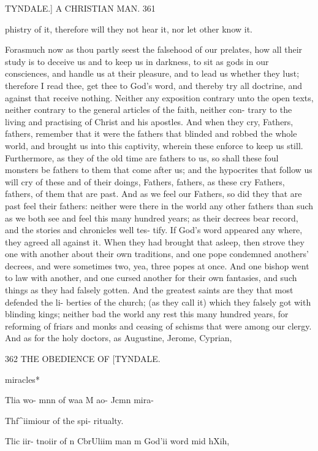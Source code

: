 \documentclass{custom}
\begin{document}
{TYNDALE.] A CHRISTIAN MAN. 361

phistry of it, therefore will they not hear it, nor let other 
know it. 

Forasmuch now as thou partly seest the falsehood of 
our prelates, how all their study is to deceive us and to 
keep us in darkness, to sit as gods in our consciences, and 
handle us at their pleasure, and to lead us whether they 
lust; therefore I read thee, get thee to God's word, and 
thereby try all doctrine, and against that receive nothing. 
Neither any exposition contrary unto the open texts, neither 
contrary to the general articles of the faith, neither con- 
trary to the living and practising of Christ and his apostles. 
And when they cry, Fathers, fathers, remember that it were
the fathers that blinded and robbed the whole world, and 
brought us into this captivity, wherein these enforce to 
keep us still. Furthermore, as they of the old time are 
fathers to us, so shall these foul monsters be fathers to 
them that come after us; and the hypocrites that follow us 
will cry of these and of their doings, Fathers, fathers, as 
these cry Fathers, fathers, of them that are past. And as we 
feel our Fathers, so did they that are past feel their fathers: 
neither were there in the world any other fathers than such 
as we both see and feel this many hundred years; as their 
decrees bear record, and the stories and chronicles well tes- 
tify. If God's word appeared any where, they agreed all 
against it. When they had brought that asleep, then 
strove they one with another about their own traditions, 
and one pope condemned anothers' decrees, and were 
sometimes two, yea, three popes at once. And one bishop 
went to law with another, and one cursed another for their 
own fantasies, and such things as they had falsely gotten. 
And the greatest saints are they that most defended the li- 
berties of the church; (as they call it) which they falsely got 
with blinding kings; neither bad the world any rest this 
many hundred years, for reforming of friars and monks 
and ceasing of schisms that were among our clergy. And 
as for the holy doctors, as Augustine, Jerome, Cyprian, 


362
THE OBEDIENCE OF
[TYNDALE.

miracles* 

Tlia wo- 
mnn of 
waa M ao- 
Jcmn mira- 

Thf^iimiour 
of the spi- 
ritualty. 

Tlic iir- 
tnoiir of n 
CbrUliim 
man m 
God'ii word 
mid hXih, 

}
\end{document}
